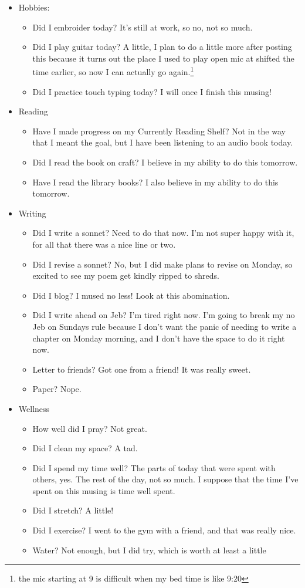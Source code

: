 \documentclass[12pt]{article}[titlepage]
\newcommand{\1}{\={a}}
\newcommand{\2}{\={e}}
\newcommand{\3}{\={\i}}
\newcommand{\4}{\=o}
\newcommand{\5}{\=u}
\newcommand{\6}{\={A}}
\renewcommand{\,}{\textsuperscript{,}}
\begin{document}
\begin{itemize}
\item Hobbies:
\begin{itemize}
\item Did I embroider today? It's still at work, so no, not so much.
\item Did I play guitar today? A little, I plan to do a little more after posting this because it turns out the place I used to play open mic at shifted the time earlier, so now I can actually go again.\footnote{the mic starting at 9 is difficult when my bed time is like 9:20}
\item Did I practice touch typing today? I will once I finish this musing!
\end{itemize}
\item Reading
\begin{itemize}
\item Have I made progress on my Currently Reading Shelf? Not in the way that I meant the goal, but I have been listening to an audio book today.
\item Did I read the book on craft? I believe in my ability to do this tomorrow.
\item Have I read the library books? I also believe in my ability to do this tomorrow.
\end{itemize}
\item Writing
\begin{itemize}
\item Did I write a sonnet? Need to do that now. I'm not super happy with it, for all that there was a nice line or two.
\item Did I revise a sonnet? No, but I did make plans to revise on Monday, so excited to see my poem get kindly ripped to shreds.
\item Did I blog? I mused no less! Look at this abomination.
\item Did I write ahead on Jeb? I'm tired right now. I'm going to break my no Jeb on Sundays rule because I don't want the panic of needing to write a chapter on Monday morning, and I don't have the space to do it right now.
\item Letter to friends? Got one from a friend! It was really sweet.
\item Paper? Nope.
\end{itemize}
\item Wellness
\begin{itemize}
\item How well did I pray? Not great.
\item Did I clean my space? A tad.
\item Did I spend my time well? The parts of today that were spent with others, yes. The rest of the day, not so much. I suppose that the time I've spent on this musing is time well spent.
\item Did I stretch? A little!
\item Did I exercise? I went to the gym with a friend, and that was really nice.
\item Water? Not enough, but I did try, which is worth at least a little
\end{itemize}
\end{itemize}
\end{document}

